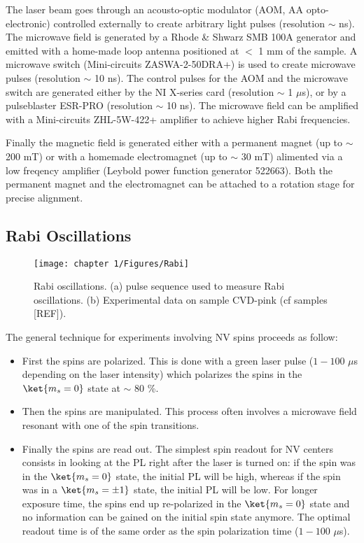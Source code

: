 \documentclass[a4paper,11pt]{report}
\begin{document}
\begin{refsection}
The laser beam goes through an acousto-optic modulator (AOM, AA opto-electronic) controlled externally to create arbitrary light pulses (resolution $\sim$ ns). The microwave field is generated by a Rhode \& Shwarz SMB 100A generator and emitted with a home-made loop antenna positioned at $<$ 1 mm of the sample. A microwave switch (Mini-circuits ZASWA-2-50DRA+) is used to create microwave pulses (resolution $\sim$ 10 ns). The control pulses for the AOM and the microwave switch are generated either by the NI X-series card (resolution $\sim$ 1 $\mu$s), or by a pulseblaster ESR-PRO (resolution $\sim$ 10 ns). The microwave field can be amplified with a Mini-circuits ZHL-5W-422+ amplifier to achieve higher Rabi frequencies. 

Finally the magnetic field is generated either with a permanent magnet (up to $\sim$ 200 mT) or with a homemade electromagnet (up to $\sim$ 30 mT) alimented via a low freqency amplifier (Leybold power function generator 522663). Both the permanent magnet and the electromagnet can be  attached to a rotation stage for precise alignment.
\subsection{Rabi Oscillations}
\begin{figure}[h!]
\centering
\texttt{[image: chapter 1/Figures/Rabi]}
\caption{Rabi oscillations. (a) pulse sequence used to measure Rabi oscillations. (b) Experimental data on sample CVD-pink (cf samples [REF]).}
\label{Rabi}
\end{figure}

The general technique for experiments involving NV spins proceeds as follow: 
\begin{itemize}
\item First the spins are polarized. This is done with a green laser pulse ($1-100$ $\mu$s depending on the laser intensity) which polarizes the spins in the $\ket{m_s=0}$ state at $\sim$ 80 \%.
\item  Then the spins are manipulated. This process often involves a microwave field resonant with one of the spin transitions.
\item Finally the spins are read out. The simplest spin readout for NV centers consists in looking at the PL right after the laser is turned on: if the spin was in the $\ket{m_s=0}$ state, the initial PL will be high, whereas if the spin was in a $\ket{m_s=\pm 1}$ state, the initial PL will be low. For longer exposure time, the spins end up re-polarized in the $\ket{m_s=0}$ state and no information can be gained on the initial spin state anymore. The optimal readout time is of the same order as the spin polarization time ($1-100$ $\mu$s).
\end{itemize}


\end{refsection}
\end{document}
